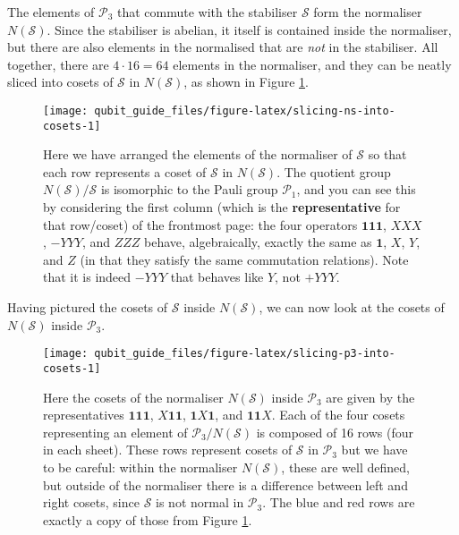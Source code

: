 \documentclass[fleqn]{article}
\begin{document}
The elements of \(\mathcal{P}_3\) that commute with the stabiliser \(\mathcal{S}\) form the normaliser \(N(\mathcal{S})\).
Since the stabiliser is abelian, it itself is contained inside the normaliser, but there are also elements in the normalised that are \emph{not} in the stabiliser.
All together, there are \(4\cdot16=64\) elements in the normaliser, and they can be neatly sliced into cosets of \(\mathcal{S}\) in \(N(\mathcal{S})\), as shown in Figure \ref{fig:slicing-ns-into-cosets}.



\begin{figure}[H]

{\centering \texttt{[image: qubit\_guide\_files/figure-latex/slicing-ns-into-cosets-1]} 

}

\caption{Here we have arranged the elements of the normaliser of \(\mathcal{S}\) so that each row represents a coset of \(\mathcal{S}\) in \(N(\mathcal{S})\). The quotient group \(N(\mathcal{S})/\mathcal{S}\) is isomorphic to the Pauli group \(\mathcal{P}_1\), and you can see this by considering the first column (which is the \textbf{representative} for that row/coset) of the frontmost page: the four operators \(\mathbf{1}\mathbf{1}\mathbf{1}\), \(XXX\), \(-YYY\), and \(ZZZ\) behave, algebraically, exactly the same as \(\mathbf{1}\), \(X\), \(Y\), and \(Z\) (in that they satisfy the same commutation relations). Note that it is indeed \(-YYY\) that behaves like \(Y\), not \(+YYY\).}\label{fig:slicing-ns-into-cosets}
\end{figure}

Having pictured the cosets of \(\mathcal{S}\) inside \(N(\mathcal{S})\), we can now look at the cosets of \(N(\mathcal{S})\) inside \(\mathcal{P}_3\).



\begin{figure}[H]

{\centering \texttt{[image: qubit\_guide\_files/figure-latex/slicing-p3-into-cosets-1]} 

}

\caption{Here the cosets of the normaliser \(N(\mathcal{S})\) inside \(\mathcal{P}_3\) are given by the representatives \(\mathbf{1}\mathbf{1}\mathbf{1}\), \(X\mathbf{1}\mathbf{1}\), \(\mathbf{1}X\mathbf{1}\), and \(\mathbf{1}\mathbf{1}X\). Each of the four cosets representing an element of \(\mathcal{P}_3/N(\mathcal{S})\) is composed of 16 rows (four in each sheet). These rows represent cosets of \(\mathcal{S}\) in \(\mathcal{P}_3\) but we have to be careful: within the normaliser \(N(\mathcal{S})\), these are well defined, but outside of the normaliser there is a difference between left and right cosets, since \(\mathcal{S}\) is not normal in \(\mathcal{P}_3\). The blue and red rows are exactly a copy of those from Figure \ref{fig:slicing-ns-into-cosets}.}\label{fig:slicing-p3-into-cosets}
\end{figure}
\end{document}
